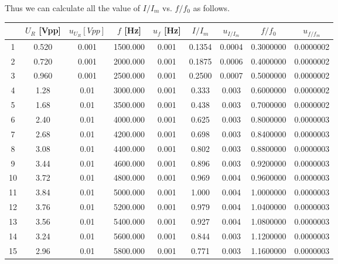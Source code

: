 \documentclass[a4paper]{article}
\begin{document}
Thus we can calculate all the value of $I/I_m$ vs. $f/f_0$ as follows.
\begin{table}[htbp]
	\centering
	\begin{tabular}{ccccccccc}
		\hline
		   & $U_R$ [Vpp] & $u_{U_R} [Vpp]$ & $f$ [Hz] & $u_f$ [Hz] & $I/I_m$ & $u_{I/I_m}$ & $f/f_0$   & $u_{f/f_m}$ \\
		\hline
		1  & 0.520       & 0.001           & 1500.000 & 0.001      & 0.1354  & 0.0004      & 0.3000000 & 0.0000002   \\
		2  & 0.720       & 0.001           & 2000.000 & 0.001      & 0.1875  & 0.0006      & 0.4000000 & 0.0000002   \\
		3  & 0.960       & 0.001           & 2500.000 & 0.001      & 0.2500  & 0.0007      & 0.5000000 & 0.0000002   \\
		4  & 1.28        & 0.01            & 3000.000 & 0.001      & 0.333   & 0.003       & 0.6000000 & 0.0000002   \\
		5  & 1.68        & 0.01            & 3500.000 & 0.001      & 0.438   & 0.003       & 0.7000000 & 0.0000002   \\
		6  & 2.40        & 0.01            & 4000.000 & 0.001      & 0.625   & 0.003       & 0.8000000 & 0.0000003   \\
		7  & 2.68        & 0.01            & 4200.000 & 0.001      & 0.698   & 0.003       & 0.8400000 & 0.0000003   \\
		8  & 3.08        & 0.01            & 4400.000 & 0.001      & 0.802   & 0.003       & 0.8800000 & 0.0000003   \\
		9  & 3.44        & 0.01            & 4600.000 & 0.001      & 0.896   & 0.003       & 0.9200000 & 0.0000003   \\
		10 & 3.72        & 0.01            & 4800.000 & 0.001      & 0.969   & 0.004       & 0.9600000 & 0.0000003   \\
		11 & 3.84        & 0.01            & 5000.000 & 0.001      & 1.000   & 0.004       & 1.0000000 & 0.0000003   \\
		12 & 3.76        & 0.01            & 5200.000 & 0.001      & 0.979   & 0.004       & 1.0400000 & 0.0000003   \\
		13 & 3.56        & 0.01            & 5400.000 & 0.001      & 0.927   & 0.004       & 1.0800000 & 0.0000003   \\
		14 & 3.24        & 0.01            & 5600.000 & 0.001      & 0.844   & 0.003       & 1.1200000 & 0.0000003   \\
		15 & 2.96        & 0.01            & 5800.000 & 0.001      & 0.771   & 0.003       & 1.1600000 & 0.0000003   \\

\end{tabular}
\end{table}
\end{document}
